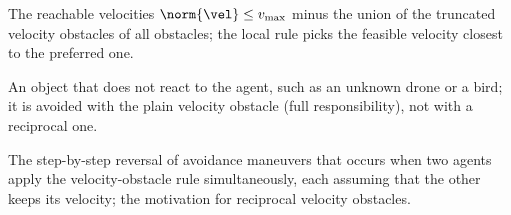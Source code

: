 \item[Feasible velocity set] The reachable velocities $\norm{\vel}\le v_{\max}$ minus the union of the truncated velocity obstacles of all obstacles; the local rule picks the feasible velocity closest to the preferred one.
\item[Non-cooperative obstacle] An object that does not react to the agent, such as an unknown drone or a bird; it is avoided with the plain velocity obstacle (full responsibility), not with a reciprocal one.
\item[Oscillation (velocity obstacles)] The step-by-step reversal of avoidance maneuvers that occurs when two agents apply the velocity-obstacle rule simultaneously, each assuming that the other keeps its velocity; the motivation for reciprocal velocity obstacles.
